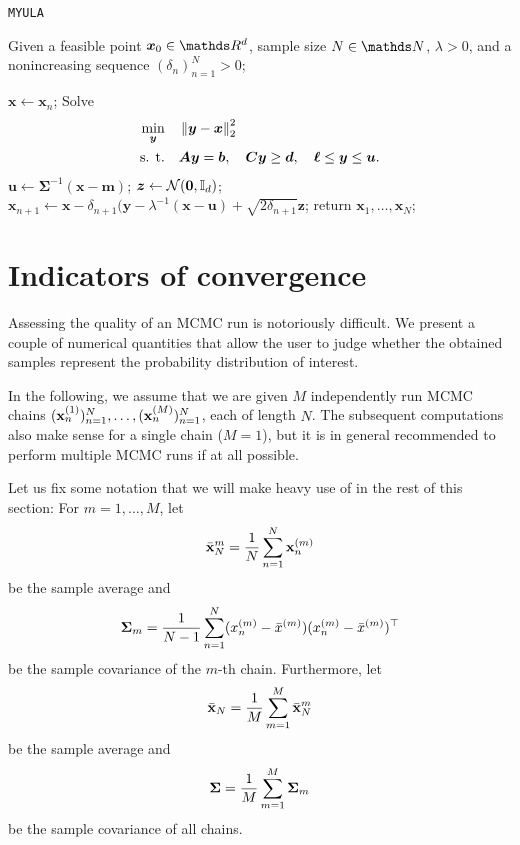 \documentclass[10pt]{article}
\numberwithin{equation}{section}
\begin{document}
\begin{algorithm}[H]
\caption{\texttt{MYULA}}
Given a feasible point $\bm x_0 \in \R^d$, sample size $N \in \N$, $\lambda > 0$, and a nonincreasing sequence $(\delta_n)_{n=1}^N > 0$;
\begin{algorithmic}[2]\label{alg:myula}
\State $\bm x \gets \bm x_n$;
\State Solve
\begin{align*}
\min_{\bm y} \quad & \left\|\bm y - \bm x\right\|_2^2 \\
\text{s. t.} \quad & \bm A \bm y = \bm b, \quad \bm C \bm y \geq \bm d, \quad \bm \ell \leq \bm y \leq \bm u.
\end{align*}
\State $\bm u \gets \bm \Sigma^{-1}(\bm x - \bm m)$;
\State $\bm z \gets \mathcal{N}(\bm 0, \mathbb{I}_d)$;
\State $\bm x_{n+1} \gets \bm x - \delta_{n+1} (\bm y - \lambda^{-1}(\bm x - \bm u) + \sqrt{2 \delta_{n+1}} \bm z$;
\EndFor
\State return $\bm x_1, \ldots, \bm x_N$;
\end{algorithmic}
\end{algorithm}



\section{Indicators of convergence}

Assessing the quality of an MCMC run is notoriously difficult. We present a couple of numerical quantities that allow the user to judge whether the obtained samples represent the probability distribution of interest.

In the following, we assume that we are given $M$ independently run MCMC chains $(\mathbf{x}_n^{(1)})_{n=1}^N, \ldots, (\mathbf{x}_n^{(M)})_{n=1}^N$, each of length $N$. The subsequent computations also make sense for a single chain ($M=1$), but it is in general recommended to perform multiple MCMC runs if at all possible.

Let us fix some notation that we will make heavy use of in the rest of this section: For $m=1,\ldots, M$, let
\begin{align*}
\bar{\mathbf{x}}_N^{m} = \frac{1}{N} \sum_{n=1}^N \mathbf{x}_n^{(m)}
\end{align*}
be the sample average and
\begin{align*}
\mathbf{\Sigma}_m = \frac{1}{N-1} \sum_{n=1}^N (x_n^{(m)} - \bar x^{(m)}) (x_n^{(m)} - \bar x^{(m)})^\top
\end{align*}
be the sample covariance of the $m$-th chain. Furthermore, let
\begin{align*}
\bar{\mathbf{x}}_N = \frac{1}{M} \sum_{m=1}^M \bar{\mathbf{x}}_N^{m}
\end{align*}
be the sample average and
\begin{align*}
\mathbf{\Sigma} = \frac{1}{M} \sum_{m=1}^M \mathbf{\Sigma}_m
\end{align*}
be the sample covariance of all chains.
\end{document}
